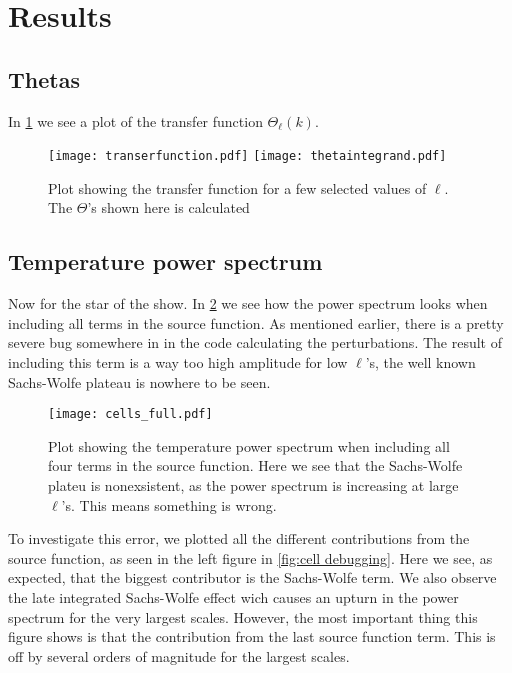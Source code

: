 \documentclass[12pt]{article}
\begin{document}
\section{Results}
\subsection{Thetas}

In \cref{fig:thetas} we see a plot of the transfer function $\Theta_{\ell}(k)$. 

\begin{figure}[h]
    \centering
    \texttt{[image: transerfunction.pdf]}
    \texttt{[image: thetaintegrand.pdf]}  
    \caption{Plot showing the transfer function for a few selected values of $\ell$. The $\Theta$'s shown here is calculated }
    \label{fig:thetas}
\end{figure}



\subsection{Temperature power spectrum}

Now for the star of the show. In \cref{fig:cell full} we see how the power spectrum looks when including all terms in the source function. As mentioned earlier, there is a pretty severe bug somewhere in in the code calculating the perturbations. The result of including this term is a way too high amplitude for low $\ell$'s, the well known Sachs-Wolfe plateau is nowhere to be seen. 

\begin{figure}[h]
    \centering
    \texttt{[image: cells\_full.pdf]} 
    \caption{Plot showing the temperature power spectrum when including all four terms in the source function. Here we see that the Sachs-Wolfe plateu is nonexsistent, as the power spectrum is increasing at large $\ell$'s. This means something is wrong.}
    \label{fig:cell full}
\end{figure}

To investigate this error, we plotted all the different contributions from the source function, as seen in the left figure in \cref{fig:cell debugging}. Here we see, as expected, that the biggest contributor is the Sachs-Wolfe term. We also observe the late integrated Sachs-Wolfe effect wich causes an upturn in the power spectrum for the very largest scales. However, the most important thing this figure shows is that the contribution from the last source function term. This is off by several orders of magnitude for the largest scales. 
\end{document}
